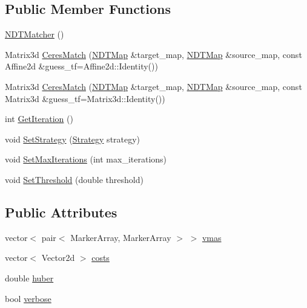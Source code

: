 \subsection*{Public Member Functions}
\begin{DoxyCompactItemize}
\item 
\hyperlink{classNDTMatcher_aa66b5b0cf92b94ef3163c976b0548d76}{N\+D\+T\+Matcher} ()
\item 
Matrix3d \hyperlink{classNDTMatcher_a42e715331fbb1cb5fc7489cea741b6df}{Ceres\+Match} (\hyperlink{classNDTMap}{N\+D\+T\+Map} \&target\+\_\+map, \hyperlink{classNDTMap}{N\+D\+T\+Map} \&source\+\_\+map, const Affine2d \&guess\+\_\+tf=Affine2d\+::\+Identity())
\item 
Matrix3d \hyperlink{classNDTMatcher_ac55488eff673a57c3d7f3ab6a59c99a1}{Ceres\+Match} (\hyperlink{classNDTMap}{N\+D\+T\+Map} \&target\+\_\+map, \hyperlink{classNDTMap}{N\+D\+T\+Map} \&source\+\_\+map, const Matrix3d \&guess\+\_\+tf=Matrix3d\+::\+Identity())
\item 
int \hyperlink{classNDTMatcher_a6a24c058f4760bd7d4ac7d900afefcc0}{Get\+Iteration} ()
\item 
void \hyperlink{classNDTMatcher_a74ba77ed2686918425795ef7019073f6}{Set\+Strategy} (\hyperlink{classNDTMatcher_a475619f9aa3d6a4f0dccad583c1306fb}{Strategy} strategy)
\item 
void \hyperlink{classNDTMatcher_a3ba71599144b6716f5c52da2db904ee6}{Set\+Max\+Iterations} (int max\+\_\+iterations)
\item 
void \hyperlink{classNDTMatcher_aeec21189c3d79542190f8cdb3a16bb19}{Set\+Threshold} (double threshold)
\end{DoxyCompactItemize}
\subsection*{Public Attributes}
\begin{DoxyCompactItemize}
\item 
vector$<$ pair$<$ Marker\+Array, Marker\+Array $>$ $>$ \hyperlink{classNDTMatcher_a2199d08f8086e84633275778031fb2b3}{vmas}
\item 
vector$<$ Vector2d $>$ \hyperlink{classNDTMatcher_a795f1ce6b6bb89f47d91b0e8ca0473c8}{costs}
\item 
double \hyperlink{classNDTMatcher_ab6fe33e97368b180642e80623e3a5d4d}{huber}
\item 
bool \hyperlink{classNDTMatcher_af784af2d35ea3310cc6a750b7b6b01e1}{verbose}
\end{DoxyCompactItemize}


